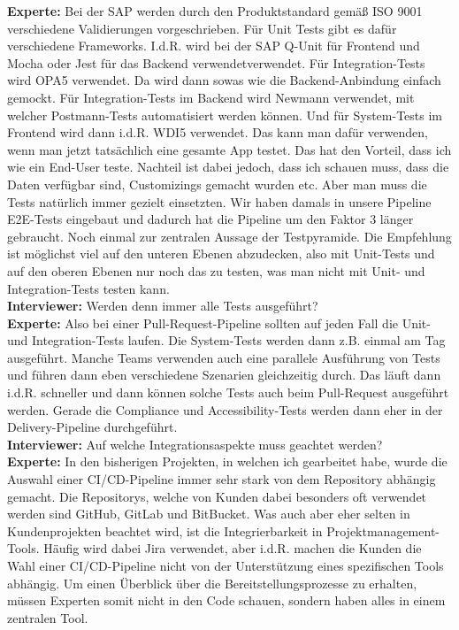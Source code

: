 \begin{linenumbers}
    \textbf{Experte:} Bei der SAP werden durch den Produktstandard gemäß ISO 9001 verschiedene Validierungen vorgeschrieben. Für Unit Tests gibt es dafür verschiedene Frameworks. I.d.R. wird bei der SAP Q-Unit für Frontend und Mocha oder Jest für das Backend verwendetverwendet. Für Integration-Tests wird OPA5 verwendet. Da wird dann sowas wie die Backend-Anbindung einfach gemockt. Für Integration-Tests im Backend wird Newmann verwendet, mit welcher Postmann-Tests automatisiert werden können. Und für System-Tests im Frontend wird dann i.d.R. WDI5 verwendet. Das kann man dafür verwenden, wenn man jetzt tatsächlich eine gesamte App testet. Das hat den Vorteil, dass ich wie ein End-User teste. Nachteil ist dabei jedoch, dass ich schauen muss, dass die Daten verfügbar sind, Customizings gemacht wurden etc. Aber man muss die Tests natürlich immer gezielt einsetzten. Wir haben damals in unsere Pipeline E2E-Tests eingebaut und dadurch hat die Pipeline um den Faktor 3 länger gebraucht. Noch einmal zur zentralen Aussage der Testpyramide. Die Empfehlung ist möglichst viel auf den unteren Ebenen abzudecken, also mit Unit-Tests und auf den oberen Ebenen nur noch das zu testen, was man nicht mit Unit- und Integration-Tests testen kann.\\
    \textbf{Interviewer:} Werden denn immer alle Tests ausgeführt?\\
    \textbf{Experte:} Also bei einer Pull-Request-Pipeline sollten auf jeden Fall die Unit- und Integration-Tests laufen. Die System-Tests werden dann z.B. einmal am Tag ausgeführt. Manche Teams verwenden auch eine parallele Ausführung von Tests und führen dann eben verschiedene Szenarien gleichzeitig durch. Das läuft dann i.d.R. schneller und dann können solche Tests auch beim Pull-Request ausgeführt werden. Gerade die Compliance und Accessibility-Tests werden dann eher in der Delivery-Pipeline durchgeführt.\\
    \textbf{Interviewer:} Auf welche Integrationsaspekte muss geachtet werden?\\
    \textbf{Experte:} In den bisherigen Projekten, in welchen ich gearbeitet habe, wurde die Auswahl einer CI/CD-Pipeline immer sehr stark von dem Repository abhängig gemacht. Die Repositorys, welche von Kunden dabei besonders oft verwendet werden sind GitHub, GitLab und BitBucket. Was auch aber eher selten in Kundenprojekten beachtet wird, ist die Integrierbarkeit in Projektmanagement-Tools. Häufig wird dabei Jira verwendet, aber i.d.R. machen die Kunden die Wahl einer CI/CD-Pipeline nicht von der Unterstützung eines spezifischen Tools abhängig. Um einen Überblick über die Bereitstellungsprozesse zu erhalten, müssen Experten somit nicht in den Code schauen, sondern haben alles in einem zentralen Tool.\\ 

\end{linenumbers}

